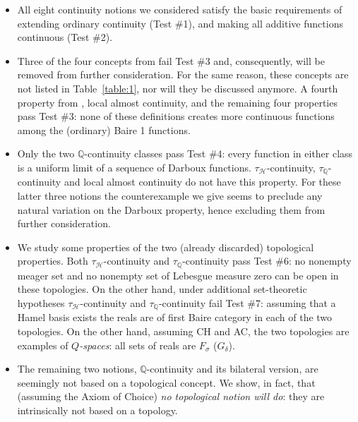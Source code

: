 \documentclass[11pt]{amsart} %
\theoremstyle{definition}
\newcommand{\Q}{\mathbb{Q}}
\newcommand{\AD}{\mathcal{H}}
\begin{document}
\begin{itemize} 
\item All eight continuity notions we considered satisfy the basic requirements of extending ordinary continuity (Test \#1),
and making all additive functions continuous (Test \#2).

\item Three of the four concepts from \cite{11} fail Test \#3 and, consequently, will be removed from further consideration. For the same reason, these concepts are not listed in Table~\ref{table:1}, nor will they be discussed anymore. A fourth property from \cite{11}, local almost continuity,  and the remaining four properties pass Test \#3: none of these definitions creates more continuous
functions among the (ordinary) Baire 1 functions.

\item Only the two $\Q$-continuity classes pass Test \#4: every function in either class is a uniform limit of a sequence of
Darboux functions. $\tau_{\AD}$-continuity, $\tau_{\Q}$-continuity and local almost continuity do not have this property. For these latter three notions the counterexample we give seems to preclude any natural variation on the
Darboux property, hence excluding them from further consideration. 

\item We study some properties of the two (already discarded) topological properties. Both $\tau_{\AD}$-continuity and $\tau_{\Q}$-continuity pass Test \#6: no nonempty meager set and no nonempty set of
Lebesgue measure zero can be open in these topologies. On the other hand, under additional set-theoretic hypotheses $\tau_{\AD}$-continuity and $\tau_{\Q}$-continuity fail Test \#7: assuming that a Hamel basis exists
the reals are of first Baire category in each of the two topologies. On the other hand, assuming CH and AC, the two topologies are examples of \emph{$Q$-spaces}: all 
sets of reals
are $F_{\sigma}$ ($G_{\delta}$).



\item The remaining two
notions, $\Q$-continuity and its bilateral version, are seemingly not based on a topological concept. We show, in fact, that (assuming the Axiom of Choice) \emph{no topological
notion will do}: they are intrinsically not based on a topology.



\end{itemize} 
\end{document}
